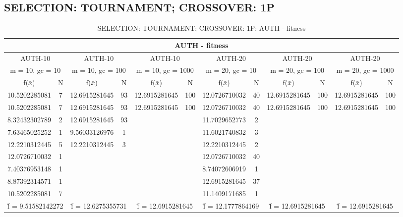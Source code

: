 \subsection{SELECTION: TOURNAMENT; CROSSOVER: 1P}
\begin{table}[H]
	\centering
	\caption{SELECTION: TOURNAMENT; CROSSOVER: 1P: AUTH - fitness}
	\begin{adjustbox}{width=1\textwidth}
		\begin{tabular}{ |c|c||c|c||c|c||c|c||c|c||c|c| }
			\hline
			\multicolumn{12}{|c|}{AUTH - fitness} \\
			\hline
			\multicolumn{2}{|c||}{AUTH-10} & \multicolumn{2}{c||}{AUTH-10} & \multicolumn{2}{c||}{AUTH-10} & \multicolumn{2}{c||}{AUTH-20} & \multicolumn{2}{c||}{AUTH-20} & \multicolumn{2}{c|}{AUTH-20}\\
			\hline
			\multicolumn{2}{|c||}{m = 10, gc = 10} & \multicolumn{2}{c||}{m = 10, gc = 100} & \multicolumn{2}{c||}{m = 10, gc = 1000} & \multicolumn{2}{c||}{m = 20, gc = 10} & \multicolumn{2}{c||}{m = 20, gc = 100} & \multicolumn{2}{c|}{m = 20, gc = 1000}\\
			\hline
			f($\bar{x}$) & N & f($\bar{x}$) & N & f($\bar{x}$) & N & f($\bar{x}$) & N & f($\bar{x}$) & N & f($\bar{x}$) & N\\
			\hline
			\hline
			10.5202285081 & 7 & 12.6915281645 & 93 & 12.6915281645 & 100 & 12.0726710032 & 40 & 12.6915281645 & 100 & 12.6915281645 & 100\\
			\hline
			10.5202285081 & 7 & 12.6915281645 & 93 & 12.6915281645 & 100 & 12.0726710032 & 40 & 12.6915281645 & 100 & 12.6915281645 & 100\\
			8.32432302789 & 2 & 12.6915281645 & 93 &   &   & 11.7029652773 & 2 &   &   &   &  \\
			7.63465025252 & 1 & 9.56033126976 & 1 &   &   & 11.6021740832 & 3 &   &   &   &  \\
			12.2210312445 & 5 & 12.2210312445 & 3 &   &   & 12.2210312445 & 2 &   &   &   &  \\
			12.0726710032 & 1 &   &   &   &   & 12.0726710032 & 40 &   &   &   &  \\
			7.40376953148 & 1 &   &   &   &   & 8.74072606919 & 1 &   &   &   &  \\
			8.87392314571 & 1 &   &   &   &   & 12.6915281645 & 37 &   &   &   &  \\
			10.5202285081 & 7 &   &   &   &   & 11.1409171685 & 1 &   &   &   &  \\
			\hline
			\multicolumn{2}{|c||}{\^{f} = 9.51582142272} & \multicolumn{2}{c||}{\^{f} = 12.6275355731} & \multicolumn{2}{c||}{\^{f} = 12.6915281645} & \multicolumn{2}{c||}{\^{f} = 12.1777864169} & \multicolumn{2}{c||}{\^{f} = 12.6915281645} & \multicolumn{2}{c|}{\^{f} = 12.6915281645}\\
			\hline
		\end{tabular}
	\end{adjustbox}
\end{table}
